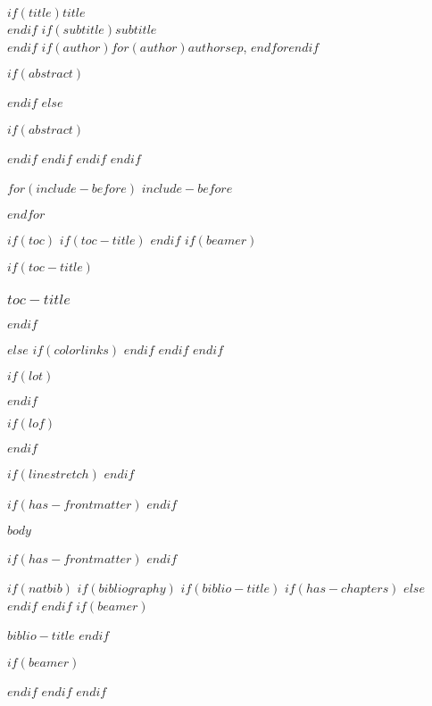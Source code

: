 \documentclass[
    $if(fontsize)$
      $fontsize$,
    $endif$
    $if(lang)$
      $babel-lang$,
    $endif$
    $if(papersize)$
      $papersize$paper,
    $endif$
    $if(beamer)$
        ignorenonframetext,
        $if(handout)$
          handout,
        $endif$
        $if(aspectratio)$
          aspectratio=$aspectratio$,
        $endif$
    $endif$
    $for(classoption)$
      $classoption$$sep$,
    $endfor$
]{$documentclass$}
\newif\ifbibliography
\begin{document}
            \begin{flushright}
                $if(title)$\textbf{$title$}\\$endif$
                $if(subtitle)$\textit{$subtitle$}\\$endif$
                $if(author)$$for(author)$$author$$sep$, $endfor$$endif$
            \end{flushright}
            $if(abstract)$
                \begin{abstract}
                $abstract$
                \end{abstract}
            $endif$
        $else$
            \maketitle
            $if(abstract)$
                \begin{abstract}
                $abstract$
                \end{abstract}
            $endif$
        $endif$
    $endif$
$endif$

$for(include-before)$
$include-before$

$endfor$

$if(toc)$
    $if(toc-title)$
        \renewcommand*\contentsname{$toc-title$}
    $endif$
    $if(beamer)$
        \begin{frame}[allowframebreaks]
            $if(toc-title)$
              \frametitle{$toc-title$}
            $endif$
            \tableofcontents[hideallsubsections]
        \end{frame}
    $else$
        {
        $if(colorlinks)$
        \hypersetup{linkcolor=$if(toccolor)$$toccolor$$else$$endif$}
        $endif$
        \setcounter{tocdepth}{$toc-depth$}
        \tableofcontents
        }
    $endif$
$endif$

$if(lot)$
\listoftables
$endif$

$if(lof)$
\listoffigures
$endif$

$if(linestretch)$
$endif$

$if(has-frontmatter)$
\mainmatter
$endif$

$body$

$if(has-frontmatter)$
\backmatter
$endif$

$if(natbib)$
    $if(bibliography)$
        $if(biblio-title)$
            $if(has-chapters)$
            \renewcommand\bibname{$biblio-title$}
            $else$
            \renewcommand\refname{$biblio-title$}
            $endif$
        $endif$
        $if(beamer)$
        \begin{frame}[allowframebreaks]{$biblio-title$}
          \bibliographytrue
        $endif$
        
        $if(beamer)$
        \end{frame}
        $endif$
    $endif$
$endif$
\end{document}
